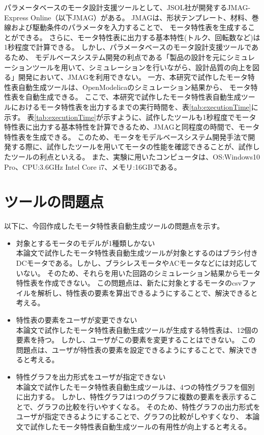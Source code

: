パラメータベースのモータ設計支援ツールとして、JSOL社が開発するJMAG-Express Online（以下JMAG）がある\cite{jmag}。
JMAGは、形状テンプレート、材料、巻線および駆動条件のパラメータを入力することで、
モータ特性表を生成することができる。
さらに、モータ特性表に出力する基本特性(トルク、回転数など)は1秒程度で計算できる。
しかし、パラメータベースのモータ設計支援ツールであるため、
モデルベースシステム開発の利点である「製品の設計を元にシミュレーションツールを用いて、シミュレーションを行いながら、設計品質の向上を図る」開発において、JMAGを利用できない。
一方、本研究で試作したモータ特性表自動生成ツールは、OpenModelicaのシミュレーション結果から、
モータ特性表を自動生成できる。
ここで、本研究で試作したモータ特性表自動生成ツールにおけるモータ特性表を出力するまでの実行時間を、表\ref{tab:executionTime}に示す。
表\ref{tab:executionTime}が示すように、試作したツールも1秒程度でモータ特性表に出力する基本特性を計算できるため、JMAGと同程度の時間で、モータ特性表を生成できる。
このため、モータをモデルベースシステム開発手法で開発する際に、試作したツールを用いてモータの性能を確認できることが、試作したツールの利点といえる。
また、実験に用いたコンピュータは、OS:Windows10 Pro、CPU:3.6GHz Intel Core i7、メモリ:16GBである。

\section{ツールの問題点}

以下に、今回作成したモータ特性表自動生成ツールの問題点を示す。

\begin{itemize}
	\item 対象とするモータのモデルが1種類しかない\\
      本論文で試作したモータ特性表自動生成ツールが対象とするのはブラシ付きDCモータである。しかし、ブラシレスモータやACモータなどには対応していない。
      そのため、それらを用いた回路のシミュレーション結果からモータ特性表を作成できない。
		  この問題点は、新たに対象とするモータのcsvファイルを解析し、特性表の要素を算出できるようにすることで、解決できると考える。

  \item 特性表の要素をユーザが変更できない\\
        本論文で試作したモータ特性表自動生成ツールが生成する特性表は、12個の要素を持つ。
        しかし、ユーザがこの要素を変更することはできない。
        この問題点は、ユーザが特性表の要素を設定できるようにすることで、解決できると考える。

  \item 特性グラフを出力形式をユーザが指定できない\\
        本論文で試作したモータ特性表自動生成ツールは、4つの特性グラフを個別に出力する。
        しかし、特性グラフは1つのグラフに複数の要素を表示することで、グラフの比較を行いやすくなる。
        そのため、特性グラフの出力形式をユーザが指定できるようにすることで、グラフの比較がしやすくなり、 本論文で試作したモータ特性表自動生成ツールの有用性が向上すると考える。


\end{itemize}







